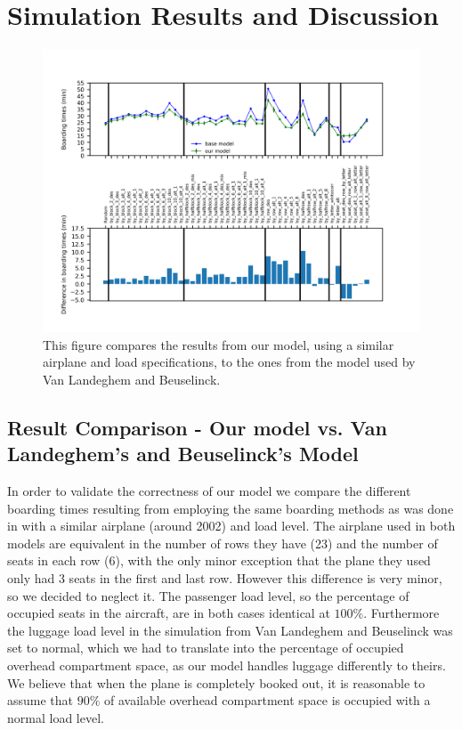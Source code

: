 \documentclass[11pt]{article}
\begin{document}
\section{Simulation Results and Discussion}
\begin{figure}
	\includegraphics[width=\linewidth]{../../code/AirplaneBoarding/data/figure1/figure1.png}
	\caption{This figure compares the results from our model, using a similar airplane and load specifications, to the ones from the model used by Van Landeghem and Beuselinck.}
	\label{figure1}
\end{figure}
\subsection{Result Comparison - Our model vs. Van Landeghem's and Beuselinck's Model} \label{model_comp}
In order to validate the correctness of our model we compare the different boarding times resulting from employing the same boarding methods as was done in \cite{beus} with a similar airplane (around 2002) and load level. The airplane used in both models are equivalent in the number of rows they have (23) and the number of seats in each row (6), with the only minor exception that the plane they used only had 3 seats in the first and last row. However this difference is very minor, so we decided to neglect it. The passenger load level, so the percentage of occupied seats in the aircraft, are in both cases identical at $100\%$. Furthermore the luggage load level in the simulation from Van Landeghem and Beuselinck was set to normal, which we had to translate into the percentage of occupied overhead compartment space, as our model handles luggage differently to theirs. We believe that when the plane is completely booked out, it is reasonable to assume that $90\%$ of available overhead compartment space is occupied with a normal load level.
\end{document}
